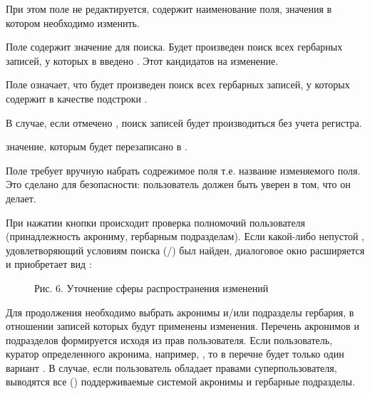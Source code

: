 \documentclass[letterpaper,10pt,russian]{sphinxmanual}
\begin{document}
При этом поле  не редактируется, содержит наименование поля,
значения в котором необходимо изменить.

Поле  содержит значение для поиска. Будет произведен поиск всех гербарных
записей, у которых в  введено . Этот  \textendash{}
кандидатов на изменение.

Поле  означает, что будет произведен поиск всех гербарных
записей, у которых  содержит в качестве подстроки .

В случае, если отмечено , поиск записей будет
производиться без учета регистра.

 \textendash{} значение, которым будет перезаписано 
в .

Поле  требует вручную набрать содрежимое поля  \textendash{}
т.е. название изменяемого поля. Это сделано для безопасности: пользователь должен
быть уверен в том, что он делает.

При нажатии кнопки  происходит проверка полномочий пользователя (принадлежность
акрониму, гербарным подразделам). Если какой-либо непустой ,
удовлетворяющий условиям поиска (/) был найден,
диалоговое окно расширяется и приобретает вид {\hyperref[\detokenize{main:main-pic6}]{}}:

\begin{figure}[htbp]
\centering
\capstart

\noindent{}
\caption{Рис. 6. Уточнение сферы распространения изменений}\label{\detokenize{main:main-pic6}}\label{\detokenize{main:id69}}\end{figure}

Для продолжения необходимо выбрать акронимы и/или подразделы гербария, в отношении
записей которых будут применены изменения. Перечень акронимов и подразделов
формируется исходя из прав пользователя. Если пользователь, куратор определенного акронима,
например, , то в перечне будет только один вариант .
В случае, если пользователь обладает правами суперпользователя, выводятся все ({\hyperref[\detokenize{main:main-pic6}]{}})
поддерживаемые системой акронимы и гербарные подразделы.
\end{document}
